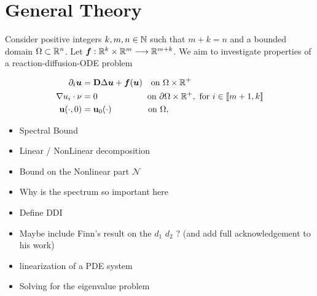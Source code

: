 \section{General Theory}

Consider positive integers $k, m, n \in \mathbb{N}$ such that $m+k = n$ and a bounded domain $\Omega \subset \mathbb{R}^{n}$. Let $\bm f : \mathbb{R}^k \times \mathbb{R}^m \longrightarrow \mathbb{R}^{m+k}$. We aim to investigate properties of a reaction-diffusion-ODE problem
 
\begin{align}
	\partial_t\bm{u}  &= \bm{\mathrm D} \Delta \bm{u} + \bm{f}(\bm{u}) \quad \text{on } \Omega \times \mathbb R^{+} \notag \\  \nabla u_i \cdot \nu &= 0 \qquad\qquad\qquad\! \text{on } \partial\Omega \times \mathbb R^{+}, \text{ for } i \in [\![ m+1, k ]\!]\\
	\mathbf{u}(\cdot, 0) &= \mathbf{u}_0(\cdot) \qquad\qquad\; \text{on } \Omega, \notag
\end{align}


\begin{theorem} 
	
\end{theorem}



\begin{itemize}
    \item Spectral Bound
    \item Linear / NonLinear decomposition
    \item Bound on the Nonlinear part $\mathcal N$
    
    \item Why is the spectrum so important here
    \item Define DDI
    \item Maybe include Finn's result on the $d_1$ $d_2$ ? (and add full acknowledgement to his work)
    \item linearization of a PDE system
    \item Solving for the eigenvalue problem   
\end{itemize}